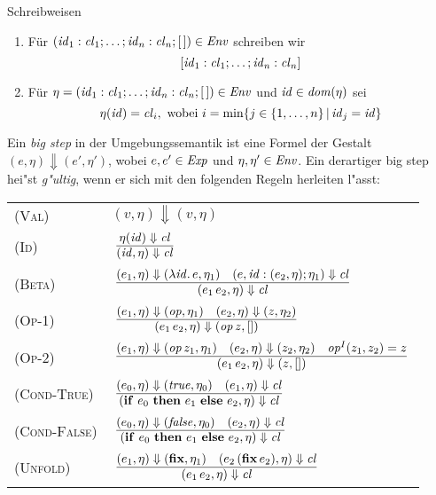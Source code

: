 \documentclass[12pt,fleqn,a4paper]{article}
\newcommand{\RN}[1]{\mbox{\textsc{(#1)}}}
\newcommand{\cl}{\name{cl}}
\begin{document}
\noindent Schreibweisen
\begin{enumerate}
\item F\"ur $(\id_1:\cl_1;\ldots;\id_n:\cl_n;[\,])\in\Env$ schreiben wir
  \[
  [\id_1:\cl_1;\ldots;\id_n:\cl_n]
  \]
\item F\"ur $\eta=(\id_1:\cl_1;\ldots;\id_n:\cl_n;[\,])\in\Env$ und ${\text{\it id\/}}\in{\text{\it dom\/}}(\eta)$ sei
  \[
  \eta(\id) = \cl_i, \text{ wobei } i = \min\{j \in \{1,\ldots,n\}\,|\,\id_j=\id\}
  \]
\end{enumerate}

\begin{definition}
Ein {\em big step} in der Umgebungssemantik ist eine Formel der Gestalt $(e,\eta) \Downarrow (e',\eta')$,
wobei $e,e'\in{\text{\it Exp\/}}$ und $\eta,\eta'\in{\text{\it Env\/}}$. Ein derartiger big step hei"st {\em g"ultig}, wenn er sich mit den
folgenden Regeln herleiten l"asst: \\[5mm]
\begin{tabular}{ll}
  \RN{Val}        & $(v,\eta) \Downarrow (v,\eta)$ \\[3mm]
  \RN{Id}         & $\regel{\eta(\id) \Downarrow \cl}
                           {(\id,\eta) \Downarrow \cl}$ \\[3mm]
  \RN{Beta}       & $\regel{(e_1,\eta) \Downarrow (\abstr{\id}{e},\eta_1)
                            \quad (e,\id:(e_2,\eta);\eta_1) \Downarrow \cl}
                           {(\app{e_1}{e_2},\eta) \Downarrow \cl}$ \\[3mm]
  \RN{Op-1}       & $\regel{(e_1,\eta) \Downarrow (\op,\eta_1) \quad (e_2,\eta) \Downarrow (z,\eta_2)}
                           {(\app{e_1}{e_2},\eta) \Downarrow (\app{\op}{z},[])}$ \\[3mm]
  \RN{Op-2}       & $\regel{(e_1,\eta) \Downarrow (\app{\op}{z_1},\eta_1)
                            \quad (e_2,\eta) \Downarrow (z_2,\eta_2)
                            \quad \op^I(z_1,z_2) = z}
                           {(\app{e_1}{e_2},\eta) \Downarrow (z,[])}$ \\[3mm]
  \RN{Cond-True}  & $\regel{(e_0,\eta) \Downarrow (\true,\eta_0) \quad (e_1,\eta) \Downarrow \cl}
                           {(\bifte{e_0}{e_1}{e_2},\eta) \Downarrow \cl}$ \\[3mm]
  \RN{Cond-False} & $\regel{(e_0,\eta) \Downarrow (\false,\eta_0) \quad (e_2,\eta) \Downarrow \cl}
                           {(\bifte{e_0}{e_1}{e_2},\eta) \Downarrow \cl}$ \\[3mm]
  \RN{Unfold}     & $\regel{(e_1,\eta) \Downarrow (\bfix,\eta_1)
                            \quad (\app{e_2}{(\app{\bfix}{e_2})},\eta) \Downarrow \cl}
                           {(\app{e_1}{e_2},\eta) \Downarrow \cl}$
\end{tabular}
\end{definition}
\end{document}
